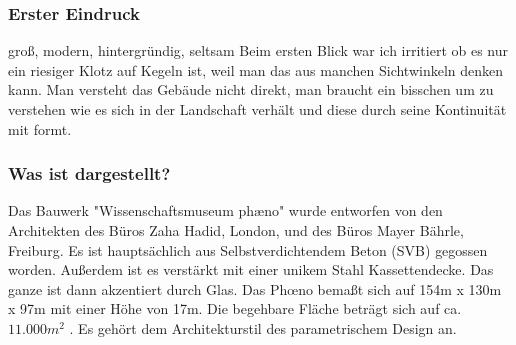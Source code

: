 \documentclass[a4paper, 12p]{article}
\begin{document}
\subsubsection{Erster Eindruck}
groß, modern, hintergründig, seltsam
Beim ersten Blick war ich irritiert ob es nur ein riesiger Klotz auf Kegeln ist,
weil man das aus manchen Sichtwinkeln denken kann. Man versteht das Gebäude
nicht direkt, man braucht ein bisschen um zu verstehen wie es sich in der
Landschaft verhält und diese durch seine Kontinuität mit formt.


\subsubsection{Was ist dargestellt?}
Das Bauwerk "Wissenschaftsmuseum phæno" wurde entworfen von den Architekten
des Büros Zaha Hadid, London, und des Büros Mayer Bährle, Freiburg.
Es ist hauptsächlich aus Selbstverdichtendem Beton (SVB) \cite{Fulcrum} gegossen worden.
Außerdem ist es verstärkt mit einer unikem Stahl Kassettendecke. Das ganze ist
dann akzentiert durch Glas. Das Phœno bemaßt sich auf 154m x 130m x 97m mit
einer Höhe von 17m. Die begehbare Fläche beträgt sich auf ca. $11.000m^{2}$
\cite{KoppJenal2006}. Es gehört dem Architekturstil des parametrischem Design
an.

\end{document}
